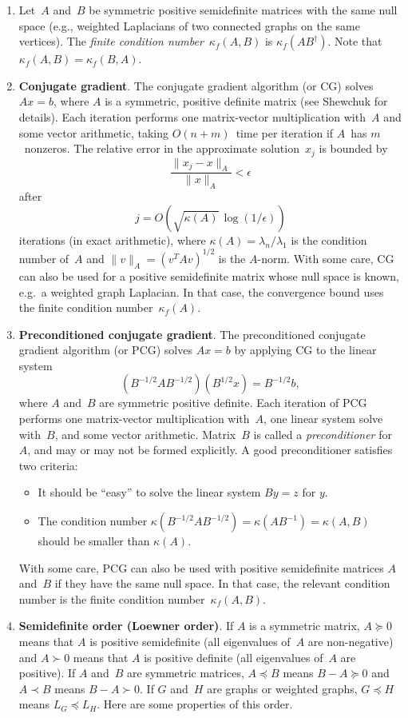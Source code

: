 \documentclass[11pt]{article}
\newcommand{\pinv}{^{\dagger}}          %
\begin{document}
\begin{enumerate}
\item
Let~$A$ and~$B$ be symmetric positive semidefinite matrices
with the same null space (e.g., weighted Laplacians of two
connected graphs on the same vertices).
The {\em finite condition number}~$\kappa_f(A,B)$ is $\kappa_f(AB\pinv)$.
Note that $\kappa_f(A,B) = \kappa_f(B,A)$.

\item{\bf Conjugate gradient}.\label{cg} 
The conjugate gradient algorithm (or CG)
solves $Ax=b$, where $A$ is a symmetric, positive definite
matrix (see Shewchuk for details).
Each iteration performs one matrix-vector multiplication with~$A$
and some vector arithmetic, taking $O(n+m)$~time per iteration
if $A$~has $m$~nonzeros.
The relative error in the approximate solution~$x_j$ is bounded by
$$\frac{\|x_j-x\|_A}{\|x\|_A} < \epsilon$$
after 
$$j = O(\sqrt{\kappa(A)}\,\log(1/\epsilon))$$
iterations (in exact arithmetic), 
where $\kappa(A)=\lambda_n/\lambda_1$ is the condition number of~$A$
and $\|v\|_A = (v^TAv)^{1/2}$ is the $A$-norm.
With some care, CG can also be used for a positive semidefinite
matrix whose null space is known, e.g.\ a weighted graph Laplacian.
In that case, 
the convergence bound uses the finite condition number~$\kappa_f(A)$.

\item{\bf Preconditioned conjugate gradient}.\label{pcg} 
The preconditioned conjugate gradient algorithm (or PCG)
solves $Ax=b$ by applying CG to the linear system 
$$(B^{-1/2}AB^{-1/2})(B^{1/2}x) = B^{-1/2}b,$$
where $A$ and~$B$ are symmetric positive definite.
Each iteration of PCG performs one matrix-vector multiplication with~$A$,
one linear system solve with~$B$, and some vector arithmetic.
Matrix~$B$ is called a {\em preconditioner} for~$A$, 
and may or may not be formed explicitly.
A good preconditioner satisfies two criteria:
\begin{itemize}
\item It should be ``easy'' to solve the linear system $By=z$ for $y$.
\item The condition number 
$\kappa(B^{-1/2}AB^{-1/2}) = \kappa(AB^{-1}) = \kappa(A,B)$
should be smaller than $\kappa(A)$.
\end{itemize}
With some care, PCG can also be used with positive semidefinite
matrices $A$ and~$B$ if they have the same null space.
In that case, 
the relevant condition number is the finite condition number~$\kappa_f(A,B)$.

\item {\bf Semidefinite order (Loewner order)}.
If $A$ is a symmetric matrix, 
$A\succeq 0$ means that $A$ is positive semidefinite 
(all eigenvalues of~$A$ are non-negative) and
$A\succ 0$ means that $A$ is positive definite
(all eigenvalues of~$A$ are positive).
If $A$ and~$B$ are symmetric matrices, 
$A\preceq B$ means $B-A\succeq 0$ and
$A\prec B$ means $B-A\succ 0$.
If $G$ and~$H$ are graphs or weighted graphs, 
$G\preceq H$ means $L_G\preceq L_H$.
Here are some properties of this order.


\end{enumerate}
\end{document}

